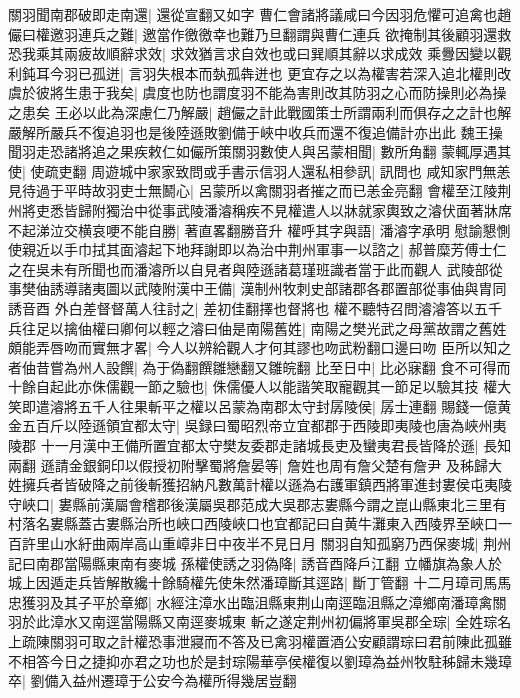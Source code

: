 關羽聞南郡破即走南還|{
	還從宣翻又如字}
曹仁會諸將議咸曰今因羽危懼可追禽也趙儼曰權邀羽連兵之難|{
	邀當作徼徼幸也難乃旦翻謂與曹仁連兵}
欲掩制其後顧羽還救恐我乘其兩疲故順辭求效|{
	求效猶言求自效也或曰巽順其辭以求成效}
乘釁因變以觀利鈍耳今羽已孤迸|{
	言羽失根本而埶孤犇迸也}
更宜存之以為權害若深入追北權則改虞於彼將生患于我矣|{
	虞度也防也謂度羽不能為害則改其防羽之心而防操則必為操之患矣}
王必以此為深慮仁乃解嚴|{
	趙儼之計此戰國策士所謂兩利而俱存之之計也解嚴解所嚴兵不復追羽也是後陸遜敗劉備于峽中收兵而還不復追備計亦出此}
魏王操聞羽走恐諸將追之果疾敕仁如儼所策關羽數使人與呂蒙相聞|{
	數所角翻}
蒙輒厚遇其使|{
	使疏吏翻}
周遊城中家家致問或手書示信羽人還私相參訊|{
	訊問也}
咸知家門無恙見待過于平時故羽吏士無鬭心|{
	呂蒙所以禽關羽者摧之而已恙金亮翻}
會權至江陵荆州將吏悉皆歸附獨治中從事武陵潘濬稱疾不見權遣人以牀就家輿致之濬伏面著牀席不起涕泣交横哀哽不能自勝|{
	著直畧翻勝音升}
權呼其字與語|{
	潘濬字承明}
慰諭懇惻使親近以手巾拭其面濬起下地拜謝即以為治中荆州軍事一以諮之|{
	郝普糜芳傅士仁之在吳未有所聞也而潘濬所以自見者與陸遜諸葛瑾班識者當于此而觀人}
武陵部從事樊伷誘導諸夷圖以武陵附漢中王備|{
	漢制州牧刺史部諸郡各郡置部從事伷與胄同誘音酉}
外白差督督萬人往討之|{
	差初佳翻擇也督將也}
權不聽特召問濬濬答以五千兵往足以擒伷權曰卿何以輕之濬曰伷是南陽舊姓|{
	南陽之樊光武之母黨故謂之舊姓}
頗能弄唇吻而實無才畧|{
	今人以辨給觀人才何其謬也吻武粉翻口邊曰吻}
臣所以知之者伷昔嘗為州人設饌|{
	為于偽翻饌雛戀翻又雛皖翻}
比至日中|{
	比必寐翻}
食不可得而十餘自起此亦侏儒觀一節之驗也|{
	侏儒優人以能諧笑取寵觀其一節足以驗其技}
權大笑即遣濬將五千人往果斬平之權以呂蒙為南郡太守封孱陵侯|{
	孱士連翻}
賜錢一億黄金五百斤以陸遜領宜都太守|{
	吳録曰蜀昭烈帝立宜都郡于西陵即夷陵也唐為峽州夷陵郡}
十一月漢中王備所置宜都太守樊友委郡走諸城長吏及蠻夷君長皆降於遜|{
	長知兩翻}
遜請金銀銅印以假授初附擊蜀將詹晏等|{
	詹姓也周有詹父楚有詹尹}
及秭歸大姓擁兵者皆破降之前後斬獲招納凡數萬計權以遜為右護軍鎮西將軍進封婁侯屯夷陵守峽口|{
	婁縣前漢屬會稽郡後漢屬吳郡范成大吳郡志婁縣今謂之崑山縣東北三里有村落名婁縣蓋古婁縣治所也峽口西陵峽口也宜都記曰自黄牛灘東入西陵界至峽口一百許里山水紆曲兩岸高山重嶂非日中夜半不見日月}
關羽自知孤窮乃西保麥城|{
	荆州記曰南郡當陽縣東南有麥城}
孫權使誘之羽偽降|{
	誘音酉降戶江翻}
立幡旗為象人於城上因遁走兵皆解散纔十餘騎權先使朱然潘璋斷其逕路|{
	斷丁管翻}
十二月璋司馬馬忠獲羽及其子平於章鄉|{
	水經注漳水出臨沮縣東荆山南逕臨沮縣之漳鄉南潘璋禽關羽於此漳水又南逕當陽縣又南逕麥城東}
斬之遂定荆州初偏將軍吳郡全琮|{
	全姓琮名}
上疏陳關羽可取之計權恐事泄寢而不答及已禽羽權置酒公安顧謂琮曰君前陳此孤雖不相答今日之捷抑亦君之功也於是封琮陽華亭侯權復以劉璋為益州牧駐秭歸未幾璋卒|{
	劉備入益州遷璋于公安今為權所得幾居豈翻}
